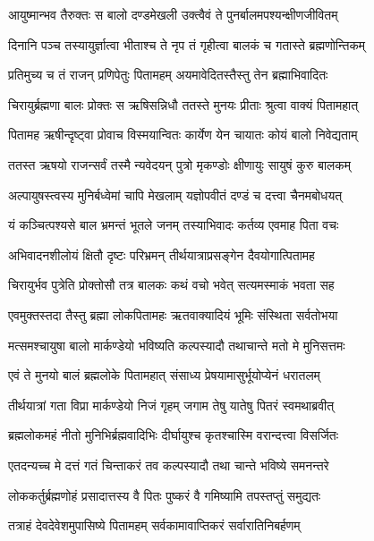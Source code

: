 \twolineshloka
{आयुष्मान्भव तैरुक्तः स बालो दण्डमेखली}
{उक्त्वैवं ते पुनर्बालमपश्यन्क्षीणजीवितम्} %

\twolineshloka
{दिनानि पञ्च तस्यायुर्ज्ञात्वा भीताश्च ते नृप}
{तं गृहीत्वा बालकं च गतास्ते ब्रह्मणोन्तिकम्} %

\twolineshloka
{प्रतिमुच्य च तं राजन् प्रणिपेतुः पितामहम्}
{अयमावेदितस्तैस्तु तेन ब्रह्माभिवादितः} %

\twolineshloka
{चिरायुर्ब्रह्मणा बालः प्रोक्तः स ऋषिसन्निधौ}
{ततस्ते मुनयः प्रीताः श्रुत्वा वाक्यं पितामहात्} %

\twolineshloka
{पितामह ऋषीन्दृष्ट्वा प्रोवाच विस्मयान्वितः}
{कार्येण येन चायातः कोयं बालो निवेद्यताम्} %

\twolineshloka
{ततस्त ऋषयो राजन्सर्वं तस्मै न्यवेदयन्}
{पुत्रो मृकण्डोः क्षीणायुः सायुषं कुरु बालकम्} %

\twolineshloka
{अल्पायुषस्त्वस्य मुनिर्बध्वेमां चापि मेखलाम्}
{यज्ञोपवीतं दण्डं च दत्त्वा चैनमबोधयत्} %

\twolineshloka
{यं कञ्चित्पश्यसे बाल भ्रमन्तं भूतले जनम्}
{तस्याभिवादः कर्तव्य एवमाह पिता वचः} %

\twolineshloka
{अभिवादनशीलोयं क्षितौ दृष्टः परिभ्रमन्}
{तीर्थयात्राप्रसङ्गेन दैवयोगात्पितामह} %

\twolineshloka
{चिरायुर्भव पुत्रेति प्रोक्तोसौ तत्र बालकः}
{कथं वचो भवेत् सत्यमस्माकं भवता सह} %

\twolineshloka
{एवमुक्तस्तदा तैस्तु ब्रह्मा लोकपितामहः}
{ऋतवाक्यादियं भूमिः संस्थिता सर्वतोभया} %



\twolineshloka
{मत्समश्चायुषा बालो मार्कण्डेयो भविष्यति}
{कल्पस्यादौ तथाचान्ते मतो मे मुनिसत्तमः} %

\twolineshloka
{एवं ते मुनयो बालं ब्रह्मलोके पितामहात्}
{संसाध्य प्रेषयामासुर्भूयोप्येनं धरातलम्} %

\twolineshloka
{तीर्थयात्रां गता विप्रा मार्कण्डेयो निजं गृहम्}
{जगाम तेषु यातेषु पितरं स्वमथाब्रवीत्} %

\twolineshloka
{ब्रह्मलोकमहं नीतो मुनिभिर्ब्रह्मवादिभिः}
{दीर्घायुश्च कृतश्चास्मि वरान्दत्त्वा विसर्जितः} %

\twolineshloka
{एतदन्यच्च मे दत्तं गतं चिन्ताकरं तव}
{कल्पस्यादौ तथा चान्ते भविष्ये समनन्तरे} %

\twolineshloka
{लोककर्तुर्ब्रह्मणोहं प्रसादात्तस्य वै पितः}
{पुष्करं वै गमिष्यामि तपस्तप्तुं समुद्यतः} %

\twolineshloka
{तत्राहं देवदेवेशमुपासिष्ये पितामहम्}
{सर्वकामावाप्तिकरं सर्वारातिनिबर्हणम्} %

